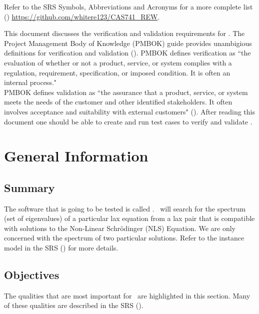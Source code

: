 \documentclass[12pt, titlepage]{article}
\begin{document}
Refer to the SRS Symbols, Abbreviations and Acronyms for a more 
complete list (\cite{SRS}) \url{https://github.com/whitere123/CAS741_REW}. 


\newpage

\tableofcontents

\listoftables


\newpage


This document discusses the verification and validation requirements for 
\progname. The Project Management Body of Knowledge (PMBOK) guide 
provides 
unambigious definitions for verification and validation (\cite{PMBOK}). PMBOK 
defines 
verification as ``the evaluation of whether or not a product, service, or 
system 
complies with a regulation, requirement, specification, or imposed condition. 
It is often an internal process." \\

PMBOK defines validation as ``the assurance that 
a product, service, or system meets the needs of the customer and other 
identified stakeholders. It often involves acceptance and suitability with 
external customers" (\cite{PMBOK}). After reading this 
document one should be able to create and run test cases to verify and validate 
\progname. 

\section{General Information}

\subsection{Summary}
\label{Summary} 

The software that is going to be tested is called \progname. \progname \ will 
search for the 
spectrum (set of eigenvalues) of a particular lax equation from a lax pair that 
is compatible 
with solutions to the Non-Linear Schr\"{o}dinger (NLS) Equation. We are only 
concerned with the spectrum of two particular solutions. Refer to the 
instance model in the SRS (\cite{SRS}) for more details.
\subsection{Objectives}
\label{Objectives}
	The qualities that are most important for \progname \ are highlighted in 
	this section. Many of these qualities are described in the SRS
	(\cite{SRS}). \\
	
\end{document}
